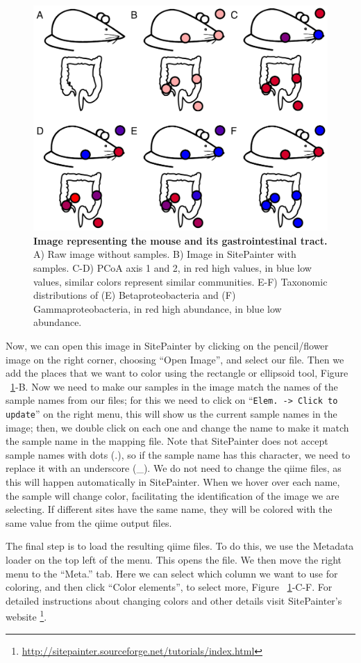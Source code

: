 \begin{figure}[htbp]
\includegraphics[width=0.75\columnwidth]{chapter_book_figures/Figure_19.jpg}
\caption[Image representing the mouse and its gastrointestinal tract]{\textbf{Image representing the mouse and its gastrointestinal tract.}
A) Raw image without samples. B) Image in SitePainter with samples. C-D)
PCoA axis 1 and 2, in red high values, in blue low values, similar colors represent
similar communities. E-F) Taxonomic distributions of (E) Betaproteobacteria and (F)
Gammaproteobacteria, in red high abundance, in blue low abundance.}
\label{bfigure19}
\end{figure}

Now, we can open this image in SitePainter by clicking on the pencil/flower image on
the right corner, choosing “Open Image”, and select our file. Then we add the places
that we want to color using the rectangle or ellipsoid tool, Figure ~\ref{bfigure19}-B.
Now we need to make our samples in the image match the names of the sample names from our
files; for this we need to click on “\texttt{Elem. -> Click to update}” on the right menu,
this will show us the current sample names in the image; then, we double click on each one
and change the name to make it match the sample name in the mapping file. Note that
SitePainter does not accept sample names with dots (.), so if the sample name has this character,
we need to replace it with an underscore (\_). We do not need to change the \gls{qiime} files, as this
will happen automatically in SitePainter. When we hover over each name, the sample will change color,
facilitating the identification of the image we are selecting. If different sites have the same name,
they will be colored with the same value from the \gls{qiime} output files.

The final step is to load the resulting \gls{qiime} files. To do this, we use the Metadata loader
on the top left of the menu. This opens the file. We then move the right menu to the “Meta.”
tab. Here we can select which column we want to use for coloring, and then click “Color elements”,
to select more, Figure ~\ref{bfigure19}-C-F. For detailed instructions about changing colors and
other details visit SitePainter's website \footnote{\url{http://sitepainter.sourceforge.net/tutorials/index.html}}.

